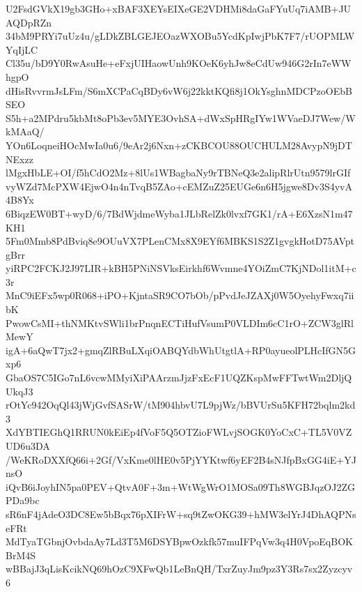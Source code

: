 U2FsdGVkX19gb3GHo+xBAF3XEYsEIXeGE2VDHMi8daGaFYuUq7iAMB+JUAQDpRZn
34bM9PRYi7uUz4u/gLDkZBLGEJEOazWXOBu5YcdKpIwjPbK7F7/rUOPMLWYqIjLC
Cl35u/bD9Y0RwAsuHe+eFxjUIHaowUnh9KOeK6yhJw8eCdUw946G2rIn7eWWhgpO
dHisRvvrmJsLFm/S6mXCPaCqBDy6vW6j22kktKQfi8j1OkYsghnMDCPzoOEbBSEO
S5h+a2MPdru5kbMt8oPb3ev5MYE3OvhSA+dWxSpHRgIYw1WVaeDJ7Wew/WkMAaQ/
YOn6LoqneiHOcMwIa0u6/9eAr2j6Nxn+zCKBCOU88OUCHULM28AvypN9jDTNExzz
lMgxHbLE+OI/f5hCdO2Mz+8lUs1WBagbaNy9rTBNeQ3e2alipRlrUtn9579lrGIf
vyWZd7McPXW4EjwO4n4nTvqB5ZAo+cEMZuZ25EUGe6n6H5jgwe8Dv3S4yvA4B8Yx
6BiqzEW0BT+wyD/6/7BdWjdmeWyba1JLbRelZk0lvxf7GK1/rA+E6XzsN1m47KH1
5Fm0Mmb8PdBviq8e9OUuVX7PLenCMx8X9EYf6MBKS1S2Z1gvgkHotD75AVptgBrr
yiRPC2FCKJ2J97LIR+kBH5PNiNSVksEirkhf6Wvmne4YOiZmC7KjNDol1itM+c3r
MnC9iEFx5wp0R068+iPO+KjntaSR9CO7bOb/pPvdJeJZAXj0W5OyehyFwxq7iibK
PwowCsMI+thNMKtvSWli1brPnqnECTiHufVsumP0VLDIm6cC1rO+ZCW3glRlMewY
igA+6aQwT7jx2+gmqZlRBuLXqiOABQYdbWhUtgtlA+RP0ayueolPLHcIfGN5Gxp6
GbaOS7C5IGo7nL6vcwMMyiXiPAArzmJjzFxEcF1UQZKspMwFFTwtWm2DljQUkqJ3
rOtYc942OqQl43jWjGvfSASrW/tM904hbvU7L9pjWz/bBVUrSu5KFH72bqlm2kd3
XdYBTIEGhQ1RRUN0kEiEp4fVoF5Q5OTZioFWLvjSOGK0YoCxC+TL5V0VZUD6u3DA
/WeKRoDXXfQ66i+2Gf/VxKme0lHE0v5PjYYKtwf6yEF2B4sNJfpBxGG4iE+YJnsO
iQvB6iJoyhIN5pa0PEV+QtvA0F+3m+WtWgWrO1MOSa09Th8WGBJqzOJ2ZGPDa9bc
sR6nF4jAdeO3DC8Ew5bBqx76pXIFrW+sq9tZwOKG39+hMW3elYrJ4DhAQPNseFRt
MdTyaTGbnjOvbdaAy7Ld3T5M6DSYBpwOzkfk57muIFPqVw3q4H0VpoEqBOKBrM4S
wBBajJ3qLisKcikNQ69hOzC9XFwQb1LeBnQH/TxrZuyJm9pz3Y3Rs7sx2Zyzcyv6
